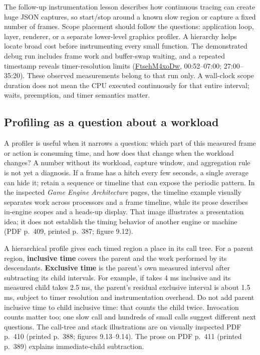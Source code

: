 The follow-up instrumentation lesson describes how continuous tracing can create huge JSON captures, so start/stop around a known slow region or capture a fixed number of frames. Scope placement should follow the questions: application loop, layer, renderer, or a separate lower-level graphics profiler. A hierarchy helps locate broad cost before instrumenting every small function. The demonstrated debug run includes frame work and buffer-swap waiting, and a repeated timestamp reveals timer-resolution limits (\href{https://www.youtube.com/watch?v=FtsehM4xoDw}{FtsehM4xoDw}, 00:52--07:00; 27:00--35:20). These observed measurements belong to that run only. A wall-clock scope duration does not mean the CPU executed continuously for that entire interval; waits, preemption, and timer semantics matter.

\subsection{Profiling as a question about a workload}\label{06-engine-ii-ch041-profiling-as-a-question-about-a-workload}

\hypertarget{06-engine-ii-ch041-profiling-as-a-question-about-a-workload}{}

A profiler is useful when it narrows a question: which part of this measured frame or action is consuming time, and how does that change when the workload changes? A number without its workload, capture window, and aggregation rule is not yet a diagnosis. If a frame has a hitch every few seconds, a single average can hide it; retain a sequence or timeline that can expose the periodic pattern. In the inspected \emph{Game Engine Architecture} pages, the timeline example visually separates work across processors and a frame timeline, while its prose describes in-engine scopes and a heads-up display. That image illustrates a presentation idea; it does not establish the timing behavior of another engine or machine (PDF p.~409, printed p.~387; figure 9.12).

A hierarchical profile gives each timed region a place in its call tree. For a parent region, \textbf{inclusive time} covers the parent and the work performed by its descendants. \textbf{Exclusive time} is the parent's own measured interval after subtracting its child intervals. For example, if  takes 4 ms inclusive and its measured  child takes 2.5 ms, the parent's residual exclusive interval is about 1.5 ms, subject to timer resolution and instrumentation overhead. Do not add parent inclusive time to child inclusive time: that counts the child twice. Invocation counts matter too; one slow call and hundreds of small calls suggest different next questions. The call-tree and stack illustrations are on visually inspected PDF p.~410 (printed p.~388; figures 9.13--9.14). The prose on PDF p.~411 (printed p.~389) explains immediate-child subtraction.

